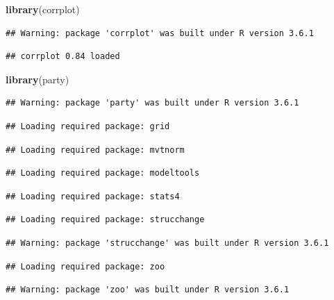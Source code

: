 \documentclass[]{article}
\newenvironment{Shaded}{\begin{snugshade}}{\end{snugshade}}
\newcommand{\KeywordTok}[1]{\textcolor[rgb]{0.13,0.29,0.53}{\textbf{#1}}}
\newcommand{\NormalTok}[1]{#1}
\begin{document}
\begin{Shaded}
\begin{Highlighting}[]
\KeywordTok{library}\NormalTok{(corrplot)}
\end{Highlighting}
\end{Shaded}

\begin{verbatim}
## Warning: package 'corrplot' was built under R version 3.6.1
\end{verbatim}

\begin{verbatim}
## corrplot 0.84 loaded
\end{verbatim}

\begin{Shaded}
\begin{Highlighting}[]
\KeywordTok{library}\NormalTok{(party)}
\end{Highlighting}
\end{Shaded}

\begin{verbatim}
## Warning: package 'party' was built under R version 3.6.1
\end{verbatim}

\begin{verbatim}
## Loading required package: grid
\end{verbatim}

\begin{verbatim}
## Loading required package: mvtnorm
\end{verbatim}

\begin{verbatim}
## Loading required package: modeltools
\end{verbatim}

\begin{verbatim}
## Loading required package: stats4
\end{verbatim}

\begin{verbatim}
## Loading required package: strucchange
\end{verbatim}

\begin{verbatim}
## Warning: package 'strucchange' was built under R version 3.6.1
\end{verbatim}

\begin{verbatim}
## Loading required package: zoo
\end{verbatim}

\begin{verbatim}
## Warning: package 'zoo' was built under R version 3.6.1
\end{verbatim}
\end{document}
